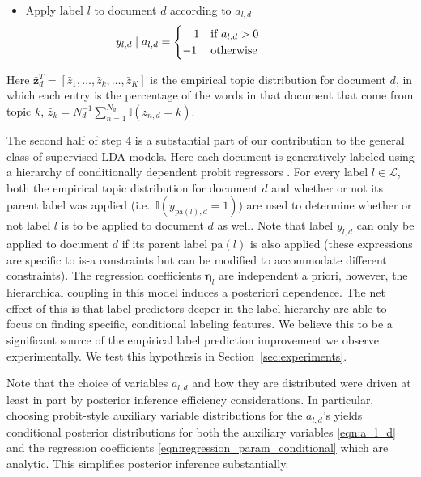 \begin{enumerate}
\begin{itemize}
\begin{itemize}
\item Apply label $l$ to document $d$ according to $a_{l,d}$ \[\hspace{-2cm}
y_{l,d}\mid a_{l,d}=\begin{cases}
\ \ \ 1 & \text{if \ensuremath{a_{l,d}>0}} \\%
-1 & \text{otherwise}\end{cases}\]
 
\end{itemize}
\end{itemize}
\end{enumerate}


Here $\bar{\mathbf{z}}_d^T = [\bar{z}_{1}, \ldots, \bar{z}_k, \ldots, \bar{z}_K]$ is the empirical topic distribution for document $d$, in which each entry is the percentage of the words in that document that come from topic $k$, $\bar{z}_{k}=N_{d}^{-1}\sum_{n=1}^{N_d}\mathbb{I}(z_{n,d}=k).$ 

The second half of step 4 is a substantial part of our contribution to the general class of supervised LDA models.  Here each document is generatively labeled using a hierarchy of conditionally dependent probit regressors \cite{gelmanbda04}.  For every label $l \in \mathcal{L}$, both the empirical topic distribution for document $d$ and whether or not its parent label was applied (i.e.~$\mathbb{I}(y_{\mathrm{pa}(l),d}=1)$) are used to determine whether or not  label $l$ is to be applied to  document $d$ as well.  Note that label $y_{l,d}$ can only be applied to document $d$ if its parent label $\mathrm{pa}(l)$ is also applied (these expressions are specific to is-a constraints but can be modified to accommodate different constraints).  The regression coefficients $\boldsymbol\eta_l$ are independent a priori, however, the hierarchical coupling in this model induces a posteriori dependence.   The net effect of this is that label predictors deeper in the label hierarchy are able to focus on finding specific, conditional labeling features.  We believe this to be a significant source of the empirical label prediction improvement we observe experimentally.  We test this hypothesis in Section~\ref{sec:experiments}.

Note that the choice of variables $a_{l,d}$ and how they are distributed were  driven at least in part by posterior inference efficiency considerations.  In particular, choosing probit-style auxiliary variable distributions for the $a_{l,d}$'s  yields conditional posterior distributions for both the auxiliary variables \eqref{eqn:a_l_d} and the regression coefficients \eqref{eqn:regression_param_conditional} which are analytic.  This simplifies posterior inference substantially.

